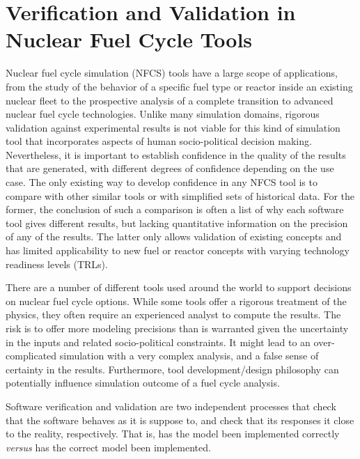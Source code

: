 \section{Verification and Validation in Nuclear Fuel Cycle Tools}

Nuclear fuel cycle simulation (NFCS) tools have a large scope of applications,
from the study of the behavior of a specific fuel type or reactor inside an
existing nuclear fleet to the prospective analysis of a complete transition to
advanced nuclear fuel cycle technologies. Unlike many simulation domains,
rigorous validation against experimental results is not viable for this kind of
simulation tool that incorporates aspects of human socio-political decision
making. Nevertheless, it is important to establish confidence in the quality of
the results that are generated, with different degrees of confidence depending
on the use case. The only existing way to develop confidence in any NFCS tool
is to compare with other similar tools or with simplified sets of historical
data. For the former, the conclusion of such a comparison is often a list of why
each software tool gives different results, but lacking quantitative information
on the precision of any of the results. The latter only allows validation of
existing concepts and has limited applicability to new fuel or reactor concepts
with varying technology readiness levels (TRLs).

There are a number of different tools used around the world to support decisions
on nuclear fuel cycle options. While some tools offer a rigorous treatment of
the physics, they often require an experienced analyst to compute the results.
The risk is to offer more modeling precisions than is warranted given the
uncertainty in the inputs and related socio-political constraints. It might lead
to an over-complicated simulation with a very complex analysis, and a false
sense of certainty in the results. Furthermore, tool development/design
philosophy can potentially influence simulation outcome of a fuel cycle
analysis.

Software verification and validation are two independent processes that
check that the software behaves as it is suppose to, and 
check that its responses it close to the reality, respectively.  That is,
has the model been implemented correctly \emph{versus} has the correct
model been implemented.

